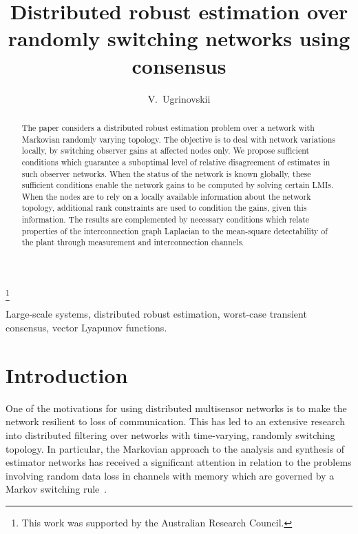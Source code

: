 \documentclass[a4paper,twocolumn]{autart}
\begin{document}
\begin{frontmatter}

\title{Distributed robust estimation over
  randomly switching networks using  consensus}


\thanks[footnoteinfo]{This work was supported by the Australian
  Research Council.}

\author[First]{V.~Ugrinovskii} 

\address[First]{School of Engineering and IT, University of NSW
  at the 
  Australian Defence Force Academy, Canberra, ACT, 2600, Australia}

          
\begin{keyword}                           Large-scale systems, distributed robust estimation, worst-case transient
consensus, vector Lyapunov functions.    
\end{keyword}

\begin{abstract} 
 The paper considers a distributed robust estimation problem over a network
 with Markovian randomly varying topology. The objective is to deal with
 network variations
 locally, by switching observer gains at affected nodes only. 
 We propose sufficient conditions which guarantee a suboptimal 
 level of relative disagreement of estimates in such observer networks. When the
 status of the network is known globally, these sufficient conditions enable the
 network gains to be computed by solving certain LMIs. When the nodes are
 to rely on a locally available information about the network topology,
 additional rank constraints are used to condition the gains, given this
 information. The results are complemented by necessary conditions which relate
 properties of the interconnection graph Laplacian to the mean-square
 detectability of the 
 plant through measurement and interconnection channels. 
 
\end{abstract}

\end{frontmatter}

\section{Introduction}

One of the motivations for using distributed multisensor networks is to make
the network resilient to loss of communication. This has led to an
extensive research into 
distributed filtering over networks with time-varying,
randomly switching topology. 
In particular, 
the Markovian approach to the analysis and synthesis of 
estimator networks has received a significant attention in relation to the
problems involving random data loss in channels 
with memory which are governed
by a Markov
switching rule~\cite{SS-2009,MMB-2009}. 
\end{document}
